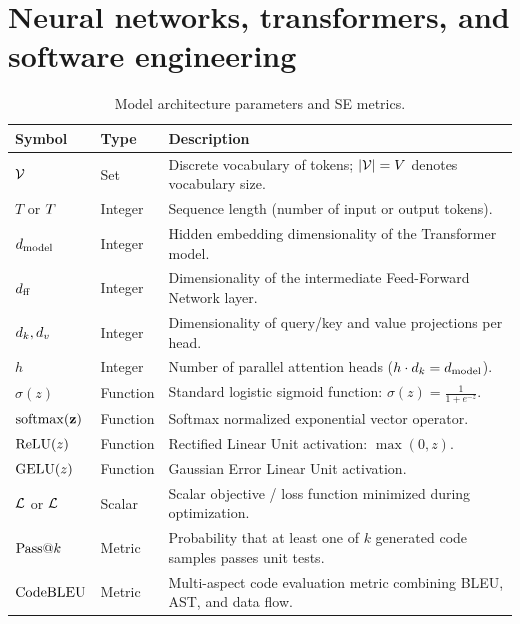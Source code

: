 \documentclass[../main.tex]{subfiles}
\begin{document}
\section*{Neural networks, transformers, and software engineering}
\begin{table}[htbp]
\centering
\small
\renewcommand{\arraystretch}{1.3}
\begin{tabularx}{\textwidth}{llX}
\toprule
\textbf{Symbol} & \textbf{Type} & \textbf{Description} \\
\midrule
$\mathcal{V}$ & Set & Discrete vocabulary of tokens; $|\mathcal{V}| = V$ denotes vocabulary size. \\
$T$ or $T$ & Integer & Sequence length (number of input or output tokens). \\
$d_{\text{model}}$ & Integer & Hidden embedding dimensionality of the Transformer model. \\
$d_{\text{ff}}$ & Integer & Dimensionality of the intermediate Feed-Forward Network layer. \\
$d_k, d_v$ & Integer & Dimensionality of query/key and value projections per head. \\
$h$ & Integer & Number of parallel attention heads ($h \cdot d_k = d_{\text{model}}$). \\
$\sigma(z)$ & Function & Standard logistic sigmoid function: $\sigma(z) = \frac{1}{1 + e^{-z}}$. \\
$\operatorname{\mathrm{softmax}}(\mathbf{z})$ & Function & Softmax normalized exponential vector operator. \\
$\operatorname{\mathrm{ReLU}}(z)$ & Function & Rectified Linear Unit activation: $\max(0, z)$. \\
$\operatorname{\mathrm{GELU}}(z)$ & Function & Gaussian Error Linear Unit activation. \\
$\mathcal{L}$ or $\L$ & Scalar & Scalar objective / loss function minimized during optimization. \\
$\mathrm{Pass}@k$ & Metric & Probability that at least one of $k$ generated code samples passes unit tests. \\
$\mathrm{CodeBLEU}$ & Metric & Multi-aspect code evaluation metric combining BLEU, AST, and data flow. \\
\bottomrule
\end{tabularx}
\caption{Model architecture parameters and SE metrics.}
\label{tab:notation_models}
\end{table}
\end{document}
